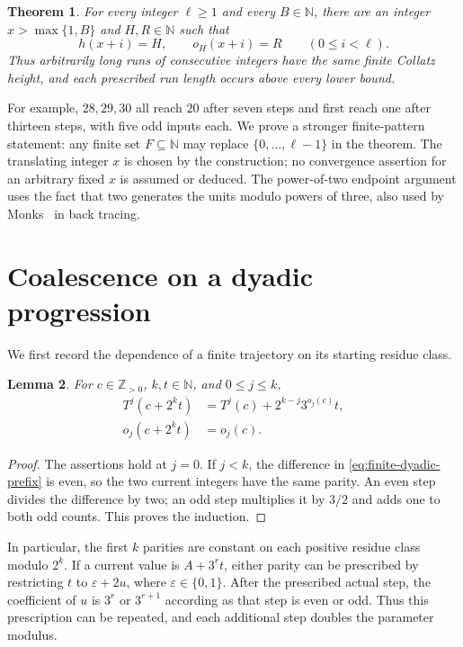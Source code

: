 \documentclass[11pt,a4paper]{article}
\newtheorem{theorem}{Theorem}
\newtheorem{lemma}[theorem]{Lemma}
\begin{document}
\begin{theorem}\label{thm:equal-heights}
For every integer $\ell\ge1$ and every $B\in\mathbb N$, there are
an integer $x>\max\{1,B\}$ and $H,R\in\mathbb N$ such that
\[
h(x+i)=H,\qquad o_H(x+i)=R\qquad(0\le i<\ell).
\]
Thus arbitrarily long runs of consecutive integers have the same
finite Collatz height, and each prescribed run length occurs above
every lower bound.
\end{theorem}

For example, $28,29,30$ all reach $20$ after seven steps and first
reach one after thirteen steps, with five odd inputs each.
We prove a stronger finite-pattern statement: any finite set
$F\subseteq\mathbb N$ may replace $\{0,\ldots,\ell-1\}$ in the theorem.
The translating integer $x$ is chosen by the construction; no
convergence assertion for an arbitrary fixed $x$ is assumed or deduced.
The power-of-two endpoint argument uses the fact that two generates
the units modulo powers of three, also used by
Monks~\cite[Lemma~3.4]{Monks2006} in back tracing.

\section{Coalescence on a dyadic progression}

We first record the dependence of a finite trajectory on its starting
residue class.

\begin{lemma}\label{lem:finite-dyadic-prefix}
For $c\in\mathbb Z_{>0}$, $k,t\in\mathbb N$, and $0\le j\le k$,
\begin{align}
T^j(c+2^kt)
 &=T^j(c)+2^{k-j}3^{o_j(c)}t,
 \label{eq:finite-dyadic-prefix}\\
o_j(c+2^kt)&=o_j(c).
 \label{eq:finite-dyadic-count}
\end{align}
\end{lemma}
\begin{proof}
The assertions hold at $j=0$. If $j<k$, the difference in
\eqref{eq:finite-dyadic-prefix} is even, so the two current integers
have the same parity. An even step divides the difference by two;
an odd step multiplies it by $3/2$ and adds one to both odd counts.
This proves the induction.
\end{proof}

In particular, the first $k$ parities are constant on each positive
residue class modulo $2^k$. If a current value is $A+3^rt$, either
parity can be prescribed by restricting $t$ to $\varepsilon+2u$,
where $\varepsilon\in\{0,1\}$. After the prescribed actual step,
the coefficient of $u$ is $3^r$ or $3^{r+1}$ according as that
step is even or odd. Thus this prescription can be repeated, and
each additional step doubles the parameter modulus.
\end{document}
